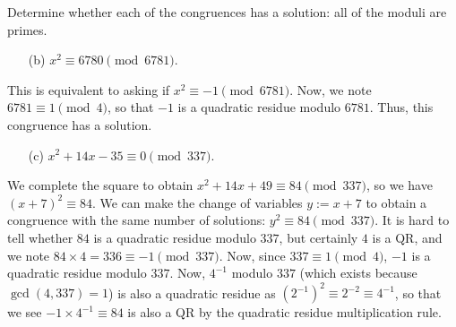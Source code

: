 \documentclass{article}
\begin{document}
\begin{exercise}[Chapter 21, \#1b-c]
Determine whether each of the congruences has a solution: all of the moduli are primes.

\begin{itemize}
    \item[(b)] $x^2\equiv 6780 \pmod{6781}$.
\end{itemize}
\begin{solution}
This is equivalent to asking if $x^2\equiv -1\pmod{6781}$. Now, we note $6781\equiv 1\pmod 4$, so that $-1$ is a quadratic residue modulo $6781$. Thus, this congruence has a solution.
\end{solution}

\begin{itemize}
    \item[(c)] $x^2+14x-35\equiv 0\pmod{337}$.
\end{itemize}
\begin{solution}
We complete the square to obtain $x^2 + 14x + 49\equiv 84 \pmod{337}$, so we have $(x + 7)^2 \equiv 84$. We can make the change of variables $y := x+7$ to obtain a congruence with the same number of solutions: $y^2 \equiv 84\pmod{337}$. It is hard to tell whether $84$ is a quadratic residue modulo $337$, but certainly $4$ is a QR, and we note $84\times 4 = 336\equiv -1\pmod{337}$. Now, since $337\equiv 1\pmod 4$, $-1$ is a quadratic residue modulo $337$. Now, $4^{-1}$ modulo $337$ (which exists because $\gcd(4, 337) = 1$) is also a quadratic residue as $(2^{-1})^2 \equiv 2^{-2} \equiv 4^{-1}$, so that we see $-1 \times 4^{-1} \equiv 84$ is also a QR by the quadratic residue multiplication rule.
\end{solution}
\end{exercise}
\end{document}
